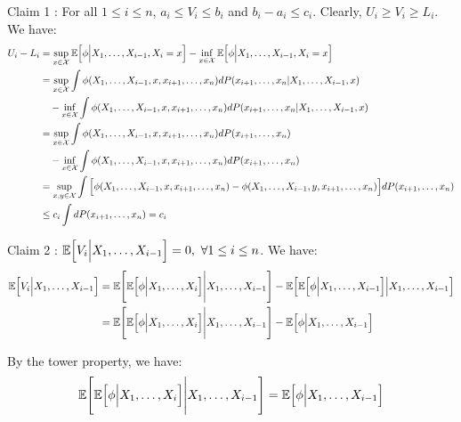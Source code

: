 \begin{proof*}
\begin{subproof}{\newline Claim 1 : For all $1\le i\le n$, $a_i\le V_i \le b_i$ and $b_i-a_i\le c_i$.}
        \noindent Clearly, $U_i \ge V_i \ge L_i$. We have:
        \begin{align*}
            U_i - L_i
                &= \sup_{x\in\mathcal{X}}\mathbb{E}\Big[ \phi\Big|X_1, \dots, X_{i-1}, X_i=x \Big] - \inf_{x\in\mathcal{X}}\mathbb{E}\Big[ \phi\Big|X_1, \dots, X_{i-1}, X_i=x \Big] \\
                &= \sup_{x\in\mathcal{X}}\int\phi(X_1, \dots, X_{i-1}, x, x_{i+1}, \dots, x_n)dP(x_{i+1}, \dots, x_n|X_1, \dots, X_{i-1}, x) \\
                & \ \ \ -\inf_{x\in\mathcal{X}}\int\phi(X_1, \dots, X_{i-1}, x, x_{i+1}, \dots, x_n)dP(x_{i+1}, \dots, x_n|X_1, \dots, X_{i-1}, x) \\
                &= \sup_{x\in\mathcal{X}}\int\phi(X_1, \dots, X_{i-1}, x, x_{i+1}, \dots, x_n)dP(x_{i+1}, \dots, x_n) \\
                & \ \ \ -\inf_{x\in\mathcal{X}}\int\phi(X_1, \dots, X_{i-1}, x, x_{i+1}, \dots, x_n)dP(x_{i+1}, \dots, x_n) \\
                &= \sup_{x, y\in \mathcal{X}} \int\Big[ 
                    \phi(X_1, \dots, X_{i-1}, x, x_{i+1}, \dots, x_n) - \phi(X_1, \dots, X_{i-1}, y, x_{i+1}, \dots, x_n)
                 \Big]dP(x_{i+1}, \dots, x_n) \\
                &\le c_i \int dP(x_{i+1}, \dots, x_n) = c_i
        \end{align*}
    \end{subproof}

    \begin{subproof}{\newline Claim 2 : $\mathbb{E}\Big[  V_i\Big| X_1, \dots, X_{i-1}  \Big] = 0, \ \forall 1 \le i \le n$.}
        We have:
        \begin{align*}
            \mathbb{E}\Big[  V_i\Big| X_1, \dots, X_{i-1}  \Big] 
                &= \mathbb{E}\Bigg[  \mathbb{E}\Big[ \phi\Big|X_1, \dots, X_i \Big] \Bigg| X_1, \dots, X_{i-1}  \Bigg]
                - \mathbb{E}\Big[  \mathbb{E}\Big[ \phi\Big|X_1, \dots, X_{i-1} \Big] \Big| X_1, \dots, X_{i-1}  \Big] \\
                &= \mathbb{E}\Bigg[  \mathbb{E}\Big[ \phi\Big|X_1, \dots, X_i \Big] \Bigg| X_1, \dots, X_{i-1}  \Bigg]
                - \mathbb{E}\Big[ \phi\Big|X_1, \dots, X_{i-1} \Big]
        \end{align*}

        \noindent By the tower property, we have:
        \begin{align*}
            \mathbb{E}\Bigg[  \mathbb{E}\Big[ \phi\Big|X_1, \dots, X_i \Big] \Bigg| X_1, \dots, X_{i-1}  \Bigg] = \mathbb{E}\Big[ \phi\Big|X_1, \dots, X_{i-1} \Big]
        \end{align*}


\end{subproof}
\end{proof*}
